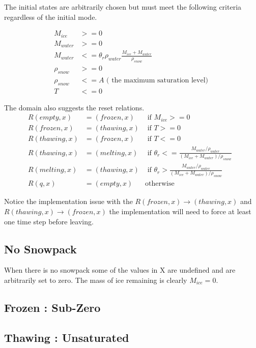 \documentclass{article}
\begin{document}
The initial states are arbitrarily chosen but must meet
the following criteria regardless of the initial mode.

\begin{align}
M_{ice} &>= 0 \\
M_{water} &>= 0 \\
M_{water} &<= \theta_{r} \rho_{water} \frac{M_{ice} + M_{water}}{\rho_{snow}} \\
\rho_{snow} &>= 0 \\
\rho_{snow} &<= A \text{ ( the maximum saturation level) } \\
T &<= 0
\end{align}

The domain also suggests the reset relations.
\begin{align}
R(empty,x) &= (frozen, x)  & \textrm{  if $M_{ice} >= 0$ } \\
R(frozen,x) &= (thawing,x) & \textrm{  if $T >= 0$ } \\
R(thawing,x) &= (frozen,x) & \textrm{  if $T <= 0$ } \\
R(thawing,x) &= (melting,x) & \textrm{  if
   $\theta_{r} <= \frac{M_{water} / \rho_{water} }
        {(M_{ice} + M_{water}) / \rho_{snow}}$  } \\
R(melting,x) &= (thawing,x) & \textrm{  if
      $\theta_{r} > \frac{M_{water} / \rho_{water} }
        {(M_{ice} + M_{water}) / \rho_{snow}}$  } \\
R(q,x) &= (empty, x) & \textrm{otherwise}
\end{align}

Notice the implementation issue with the $R(frozen,x) \to (thawing,x)$ and
$R(thawing,x) \to (frozen,x)$ the implementation will need to
force at least one time step before leaving.


\subsection{No Snowpack}

When there is no snowpack some of the values in X are undefined
and are arbitrarily set to zero.
The mass of ice remaining is clearly $M_{ice} = 0$.

\subsection{Frozen : Sub-Zero}



\subsection{Thawing : Unsaturated}
\end{document}
